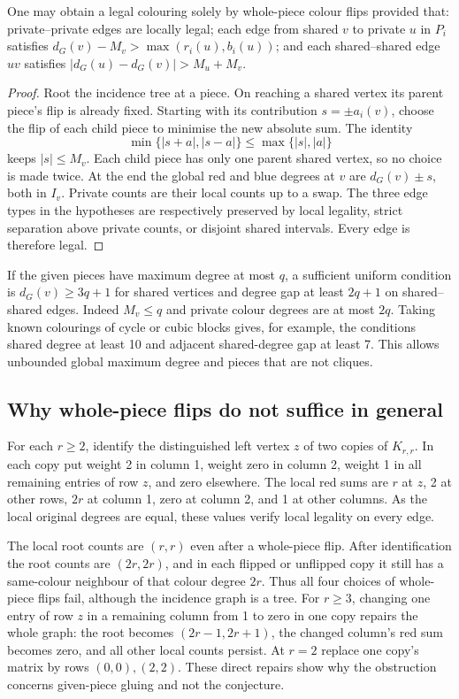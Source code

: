 \begin{theorem}[A9]\label{thm:pieceglue}
One may obtain a legal colouring solely by whole-piece colour flips
provided that: private--private edges are locally legal; each edge
from shared $v$ to private $u$ in $P_i$ satisfies
$d_G(v)-M_v>\max(r_i(u),b_i(u))$; and each shared--shared edge $uv$
satisfies $|d_G(u)-d_G(v)|>M_u+M_v$.
\end{theorem}
\begin{proof}
Root the incidence tree at a piece. On reaching a shared vertex its
parent piece's flip is already fixed. Starting with its contribution
$s=\pm a_i(v)$, choose the flip of each child piece to minimise the
new absolute sum. The identity
\[
 \min\{|s+a|,|s-a|\}\le\max\{|s|,|a|\}
\]
keeps $|s|\le M_v$. Each child piece has only one parent shared
vertex, so no choice is made twice. At the end the global red and
blue degrees at $v$ are $d_G(v)\pm s$, both in $I_v$.
Private counts are their local counts up to a swap. The three edge
types in the hypotheses are respectively preserved by local legality,
strict separation above private counts, or disjoint shared intervals.
Every edge is therefore legal.
\end{proof}

If the given pieces have maximum degree at most $q$, a sufficient
uniform condition is $d_G(v)\ge3q+1$ for shared vertices and degree
gap at least $2q+1$ on shared--shared edges. Indeed $M_v\le q$
and private colour degrees are at most $2q$. Taking known colourings
of cycle or cubic blocks gives, for example, the conditions shared
degree at least 10 and adjacent shared-degree gap at least 7. This
allows unbounded global maximum degree and pieces that are not cliques.

\subsection{Why whole-piece flips do not suffice in general}\label{sec:piecebarrier}

For each $r\ge2$, identify the distinguished left vertex $z$ of
two copies of $K_{r,r}$. In each copy put weight 2 in column 1,
weight zero in column 2, weight 1 in all remaining entries of row
$z$, and zero elsewhere. The local red sums are $r$ at $z$, 2 at
other rows, $2r$ at column 1, zero at column 2, and 1 at other
columns. As the local original degrees are equal, these values
verify local legality on every edge.

The local root counts are $(r,r)$ even after a whole-piece flip.
After identification the root counts are $(2r,2r)$, and in each
flipped or unflipped copy it still has a same-colour neighbour of
that colour degree $2r$. Thus all four choices of whole-piece flips
fail, although the incidence graph is a tree. For $r\ge3$, changing
one entry of row $z$ in a remaining column from 1 to zero in one
copy repairs the whole graph: the root becomes $(2r-1,2r+1)$,
the changed column's red sum becomes zero, and all other local
counts persist. At $r=2$ replace one copy's matrix by rows
$(0,0),(2,2)$. These direct repairs show why the obstruction concerns
given-piece gluing and not the conjecture.
